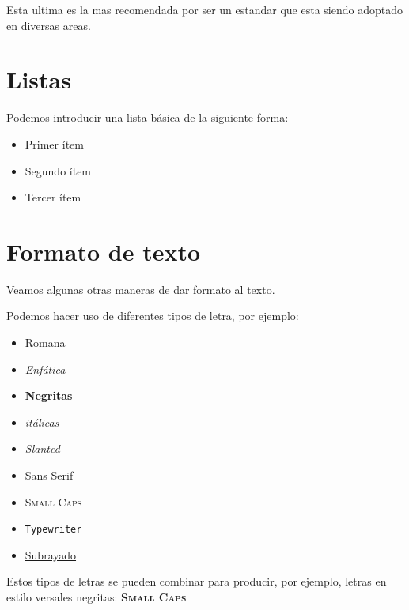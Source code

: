 \documentclass[letterpaper,11pt]{article}
\begin{document}
\noindent Esta ultima es la mas recomendada por ser un estandar que esta siendo adoptado en diversas areas.

\section{Listas}

Podemos introducir una lista básica de la siguiente forma:

\begin{itemize}
\item Primer ítem
\item Segundo ítem
\item Tercer ítem
\end{itemize}

\section{Formato de texto}

Veamos algunas otras maneras de dar formato al texto.

Podemos hacer uso de diferentes tipos de letra, por ejemplo:

\begin{itemize}
\item \textrm{Romana}

\item \emph{Enfática}

\item \textbf{Negritas}

\item \textit{itálicas}

\item \textsl{Slanted}

\item \textsf{Sans Serif}

\item \textsc{Small Caps}

\item \texttt{Typewriter}

\item \underline{Subrayado}

\end{itemize}

Estos tipos de letras se pueden combinar para producir, por ejemplo, letras en estilo versales negritas: \textbf{\textsc{Small Caps}}
\end{document}

